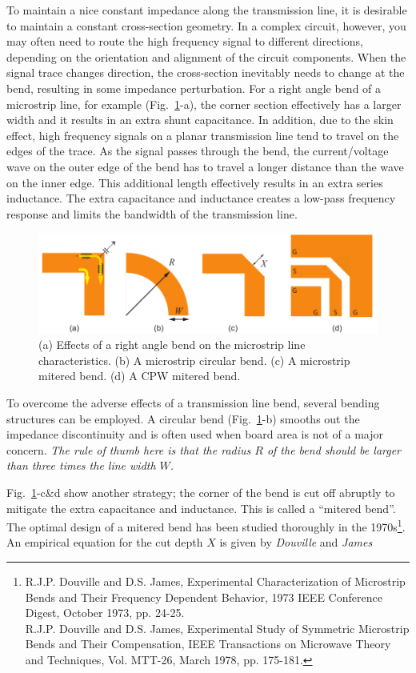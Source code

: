 \documentclass[12pt,letterpaper]{scrartcl}
\begin{document}
To maintain a nice constant impedance along the transmission line, it is desirable to maintain a constant cross-section geometry. In a complex circuit, however, you may often need to route the high frequency signal to different directions, depending on the orientation and alignment of the circuit components. When the signal trace changes direction, the cross-section inevitably needs to change at the bend, resulting in some impedance perturbation. For a right angle bend of a microstrip line, for example (Fig.~\ref{fig:bends}-a), the corner section effectively has a larger width and it results in an extra shunt capacitance. In addition, due to the skin effect, high frequency signals on a planar transmission line tend to travel on the edges of the trace. As the signal passes through the bend, the current/voltage wave on the outer edge of the bend has to travel a longer distance than the wave on the inner edge. This additional length effectively results in an extra series inductance. The extra capacitance and inductance creates a low-pass frequency response and limits the bandwidth of the transmission line. 

	\begin{figure}[hp]
		\centering
		\includegraphics{bends}
		\caption{(a) Effects of a right angle bend on the microstrip line characteristics. (b) A microstrip circular bend. (c) A microstrip mitered bend. (d) A CPW mitered bend.}
		\label{fig:bends}
	\end{figure}

To overcome the adverse effects of a transmission line bend, several bending structures can be employed. A circular bend (Fig.~\ref{fig:bends}-b) smooths out the impedance discontinuity and is often used when board area is not of a major concern. \textit{The rule of thumb here is that the radius $R$ of the bend should be larger than three times the line width $W$.}

Fig.~\ref{fig:bends}-c\&d show another strategy; the corner of the bend is cut off abruptly to mitigate the extra capacitance and inductance. This is called a ``mitered bend''. The optimal design of a mitered bend has been studied thoroughly in the 1970s\footnote{R.J.P. Douville and D.S. James, Experimental Characterization of Microstrip Bends and Their Frequency Dependent Behavior, 1973 IEEE Conference Digest, October 1973, pp. 24-25. \\
R.J.P. Douville and D.S. James, Experimental Study of Symmetric Microstrip Bends and Their Compensation, IEEE Transactions on Microwave Theory and Techniques, Vol. MTT-26, March 1978, pp. 175-181.}. An empirical equation for the cut depth $X$ is given by \textit{Douville} and \textit{James}
\end{document}

